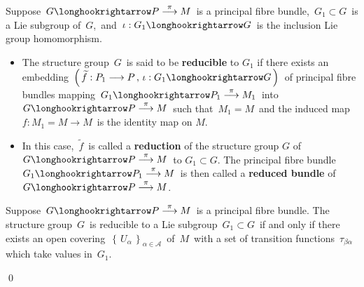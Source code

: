 
\vskip 0.5cm
\begin{definition}
\mbox{}
\vskip 0.2cm
\noindent
Suppose
\,$G \longhookrightarrow P \overset{\pi}{\longrightarrow} M$\,
is a principal fibre bundle,
\,$G_{1} \subset G$\, is a Lie subgroup of \,$G$,\, and
\,$\iota:G_{1}\longhookrightarrow G$\,
is the inclusion Lie group homomorphism.
\begin{itemize}
\item
	\vskip -0.2cm
	The structure group \,$G$\, is said to be \textbf{reducible} to $G_{1}$
	if there exists an embedding
	\,$\left(\,\widetilde{f}:P_{1}\longrightarrow P\,,\,\iota:G_{1}\longhookrightarrow G\,\right)$\,
	of principal fibre bundles mapping
	\,$G_{1} \longhookrightarrow P_{1} \overset{\pi}{\longrightarrow} M_{1}$\,
	into
	\,$G \longhookrightarrow P \overset{\pi}{\longrightarrow} M$\,
	such that
	\,$M_{1} = M$\,
	and the induced map
	\,$f : M_{1} = M \longrightarrow M$\,
	is the identity map on $M$.
\item
	In this case,
	\,$\widetilde{f}$\, is called a \textbf{reduction} of the structure group $G$ of
	\,$G \longhookrightarrow P \overset{\pi}{\longrightarrow} M$\,
	to $G_{1} \subset G$.
	The principal fibre bundle
	\,$G_{1} \longhookrightarrow P_{1} \overset{\pi}{\longrightarrow} M$\,
	is then called a \textbf{reduced bundle} of
	\,$G \longhookrightarrow P \overset{\pi}{\longrightarrow} M$.\,
	
\end{itemize}
\end{definition}


\vskip 0.5cm
\begin{proposition}
\mbox{}
\vskip 0.2cm
\noindent
Suppose
\,$G \longhookrightarrow P \overset{\pi}{\longrightarrow} M$\,
is a principal fibre bundle.
The structure group \,$G$\, is reducible to a Lie subgroup 
\,$G_{1} \subset G$\, if and only if
there exists an open covering
\,$\left\{\,U_{\alpha}\,\right\}_{\alpha\in\mathcal{A}}$\,
of \,$M$\, with a set of transition functions
\,$\tau_{\beta\alpha}$\,
which take values in \,$G_{1}$.
\end{proposition}
\proof

\qed


